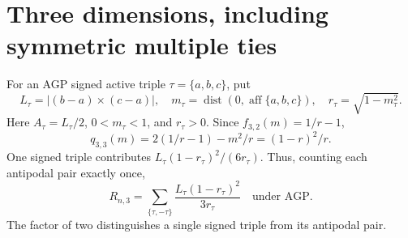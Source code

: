 \documentclass[10pt,reqno]{amsart}
\theoremstyle{definition}
\theoremstyle{remark}
\newcommand{\aff}{\operatorname{aff}}
\newcommand{\dist}{\operatorname{dist}}
\begin{document}
\section{Three dimensions, including symmetric multiple ties}\label{sec:d3}
For an AGP signed active triple $\tau=\{a,b,c\}$, put
\begin{equation}\label{eq:d3-params}
L_\tau=|(b-a)\times(c-a)|,\quad m_\tau=\dist(0,\aff\{a,b,c\}),\quad
r_\tau=\sqrt{1-m_\tau^2}.
\end{equation}
Here $A_\tau=L_\tau/2$, $0<m_\tau<1$, and $r_\tau>0$.
Since $f_{3,2}(m)=1/r-1$,
\begin{equation}\label{eq:d3-q}
q_{3,3}(m)=2(1/r-1)-m^2/r=(1-r)^2/r.
\end{equation}
One signed triple contributes $L_\tau(1-r_\tau)^2/(6r_\tau)$.
Thus, counting each antipodal pair exactly once,
\begin{equation}\label{eq:d3-correction}
R_{n,3}=\sum_{\{\tau,-\tau\}}\frac{L_\tau(1-r_\tau)^2}{3r_\tau}
\quad\text{under AGP}.
\end{equation}
The factor of two distinguishes a single signed triple from its antipodal pair.
\end{document}

